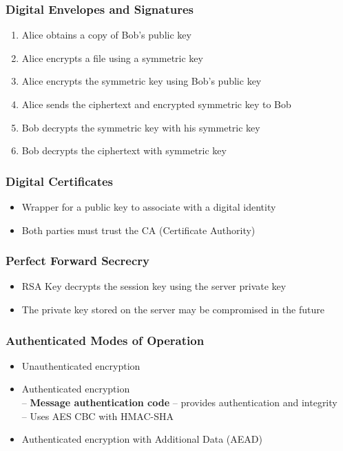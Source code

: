 		\subsubsection {Digital Envelopes and Signatures}
			\begin{enumerate}
				\item Alice obtains a copy of Bob's public key
				\item Alice encrypts a file using a symmetric key
				\item Alice encrypts the symmetric key using Bob's public key
				\item Alice sends the ciphertext and encrypted symmetric key to Bob
				\item Bob decrypts the symmetric key with his symmetric key
				\item Bob decrypts the ciphertext with symmetric key
			\end{enumerate}
		\subsubsection {Digital Certificates}
			\begin{itemize}
				\item Wrapper for a public key to associate with a digital identity
				\item Both parties must trust the CA (Certificate Authority)
			\end{itemize}
		\subsubsection {Perfect Forward Secrecry}
			\begin{itemize}
				\item RSA Key decrypts the session key using the server private key
				\item The private key stored on the server may be compromised in the future
			\end{itemize}
		\subsubsection {Authenticated Modes of Operation}
			\begin{itemize}	
				\item Unauthenticated encryption
				\item Authenticated encryption \\
					-- \textbf{Message authentication code} -- provides authentication and
						integrity \\
					-- Uses AES CBC with HMAC-SHA
				\item Authenticated encryption with Additional Data (AEAD)
			\end{itemize}
